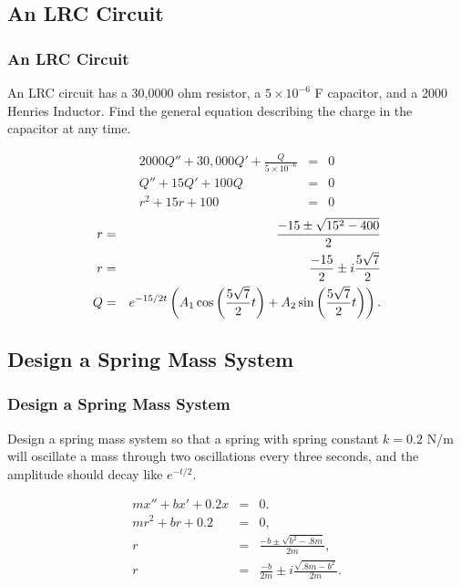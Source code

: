 \subsection{An LRC Circuit}

\begin{frame}
  \frametitle{An LRC Circuit}

  An LRC circuit has a 30,0000 ohm resistor, a $5\times 10^{-6}$ F
  capacitor, and a 2000 Henries Inductor. Find the general equation
  describing  the charge in the capacitor at any time.

  {
    \begin{eqnarray*}
      2000 Q'' + 30,000 Q' + \frac{Q}{5\times 10^{-6}} & = & 0 \\
      Q'' + 15 Q' + 100 Q & = & 0 \\
      r^2 + 15 r + 100 & = & 0 
    \end{eqnarray*}
    \begin{eqnarray*}
      r & = & \frac{-15\pm\sqrt{15^2-400}}{2} \\
      r & = & \frac{-15}{2} \pm i\frac{5\sqrt{7}}{2} \\
      Q & = & e^{-15/2 t} 
      \left( A_1 \cos\left( \frac{5\sqrt{7}}{2} t\right) + A_2 \sin\left( \frac{5\sqrt{7}}{2} t \right) \right).
    \end{eqnarray*}
    
  }

\end{frame}

\subsection{Design a Spring Mass System}

\begin{frame}
  \frametitle{Design a Spring Mass System}

  Design a spring mass system so that a spring with spring constant
  $k=0.2$ N/m will oscillate a mass through two oscillations every
  three seconds, and the amplitude should decay like $e^{-t/2}$.

  {
    \begin{eqnarray*}
      m x'' + bx' + 0.2x & = & 0. \\
      m r^2 + br + 0.2 & = & 0, \\
      r & = & \frac{-b\pm\sqrt{b^2-.8m}}{2m}, \\
      r & = & \frac{-b}{2m} \pm i \frac{\sqrt{.8m - b^2}}{2m}.
    \end{eqnarray*}
    
  }

\end{frame}


